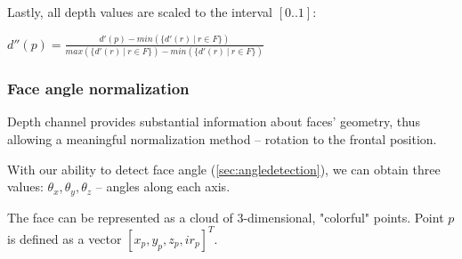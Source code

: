         Lastly, all depth values are scaled to the interval $[0..1]$:
        \begin{center}
        $
          d''(p) = \frac{d'(p) - min(\{d'(r)\ |\ r \in F\})}{max(\{d'(r)\ |\ r \in F\}) - min(\{d'(r)\ |\ r \in F\})}
        $
        \end{center}

        \subsubsection*{Face angle normalization}
        Depth channel provides substantial information about faces' geometry, thus allowing
        a meaningful normalization method -- rotation to the frontal position.

        With our ability to detect face angle (\ref{sec:angledetection}), we can obtain
        three values: $\theta_x, \theta_y, \theta_z$ -- angles along each axis.

        The face can be represented as a cloud of $3$-dimensional, "colorful" points.
        Point $p$ is defined as a vector $[x_p, y_p, z_p, ir_p]^{T}$.

